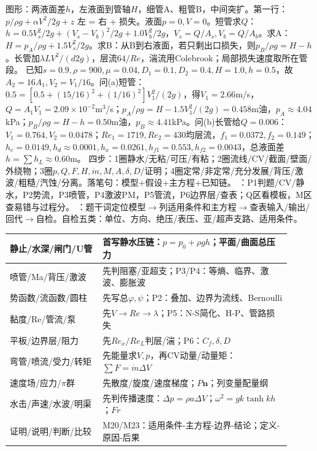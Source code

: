 ﻿
\pvzfig
{}
图形：两液面差$h$，左液面到管轴$H$，细管A、粗管B，中间突扩。第一行：$p/\rho g+\alpha V^2/2g+z$ 左 = 右 + 损失。液面$p=0,V=0$。短管求$Q$：$h=0.5V_s^2/2g+(V_s-V_b)^2/2g+1.0V_b^2/2g$，$V_s=Q/A_s,V_b=Q/A_b$。求A：$H=p_A/\rho g+1.5V_s^2/2g$。求B：从B到右液面，若只剩出口损失，则$p_B/\rho g=H-h$。长管加$\lambda L V^2/(d2g)$，层流$64/Re$，湍流用Colebrook；局部损失速度取所在管段。\schemabasics
{}
已知$s=0.9,\rho=900,\mu=0.04,D_1=0.1,D_2=0.4,H=1.0,h=0.5$，故$A_2=16A_1,V_2=V_1/16$。问(a)短管：$0.5=[0.5+(15/16)^2+(1/16)^2]V_1^2/(2g)$，得$V_1=2.66$m/s，$Q=A_1V_1=2.09\times10^{-2}$m$^3$/s；$p_A/\rho g=H-1.5V_1^2/(2g)=0.458$m油，$p_A\approx4.04$kPa；$p_B/\rho g=H-h=0.50$m油，$p_B\approx4.41$kPa。问(b)长管给$Q=0.006$：$V_1=0.764,V_2=0.0478$；$Re_1=1719,Re_2=430$均层流，$f_1=0.0372,f_2=0.149$；$h_e=0.0149,h_d\approx0.0001,h_x=0.0261,h_{f1}=0.553,h_{f2}=0.0043$，总液面差$h=\sum h_L\approx0.60$m。
四步：1圈静水/无粘/可压/有粘；2圈流线/CV/截面/壁面/外绕物；3圈$p,Q,F,H,\dot m,M,A,\delta,D$/证明；4圈定常/非定常/充分发展/背压/激波/粗糙/汽蚀/分离。落笔句：模型+假设+主方程+已知链。
：P1判题/CV/静水，P2势流，P3喷管，P4激波PM，P5管流，P6边界层/查表；Q区看模板，M区查易错与过程分。
：题干词定位模型$\to$列适用条件和主方程$\to$查表输入/输出/回代$\to$自检。自检五类：单位、方向、绝压/表压、亚/超声支路、适用条件。

\renewcommand{\arraystretch}{0.76}\begin{tabular}{|p{0.30\linewidth}|p{0.61\linewidth}|}
\hline 静止/水深/闸门/U管 & 首写静水压链：$p=p_0+\rho gh$；平面/曲面总压力\\ \hline
喷管/Ma/背压/激波 & 先判阻塞/亚超支；P3/P4：等熵、临界、激波、膨胀波\\ \hline
势函数/流函数/圆柱 & 先写总$\varphi,\psi$；P2：叠加、边界为流线、Bernoulli\\ \hline
黏度/Re/管流/泵 & 先$V\to Re\to\lambda$；P5：N-S简化、H-P、管路损失\\ \hline
平板/边界层/阻力 & 先$Re_x/Re_L$判层/湍；P6：$C_f,\delta,D$\\ \hline
弯管/喷流/受力/转矩 & 先能量求$V,p$，再CV动量/动量矩：$\sum F=\dot m\Delta V$\\ \hline
速度场/应力/$\pi$群 & 先散度/旋度/速度梯度；$P\bm n$；列变量配量纲\\ \hline
水击/声速/水波/明渠 & 先判传播速度：$\Delta p=\rho a\Delta V$；$\omega^2=gk\tanh kh$；$Fr$\\ \hline
证明/说明/判断/比较 & M20/M23：适用条件-主方程-边界-结论；定义-原因-后果\\ \hline
\end{tabular}\renewcommand{\arraystretch}{1}

